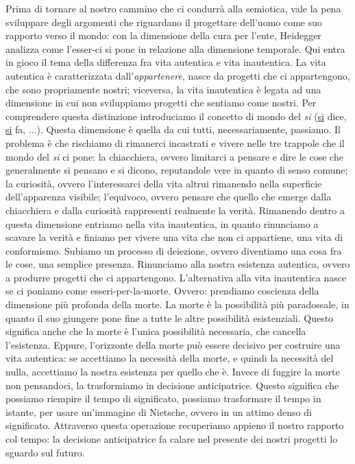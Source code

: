 \documentclass[a4paper,12pt,oneside]{article}%
\begin{document}
Prima di tornare al nostro cammino che ci condurrà alla semiotica, vale la pena sviluppare degli argomenti che riguardano il progettare dell'uomo come suo rapporto verso il mondo: con la dimensione della cura per l'ente, Heidegger analizza come l’esser-ci si pone in relazione alla dimensione temporale.
Qui entra in gioco il tema della differenza fra vita autentica e vita inautentica.
La vita autentica è caratterizzata dall'\textit{appartenere}, nasce da progetti che ci appartengono, che sono propriamente nostri; viceversa, la vita inautentica è legata ad una dimensione in cui non sviluppiamo progetti che sentiamo come nostri.
Per comprendere questa distinzione introduciamo il concetto di mondo del \textit{si} (\underline{si} dice, \underline{si} fa, ...). Questa dimensione è quella da cui tutti, necessariamente, passiamo. Il problema è che rischiamo di rimanerci incastrati e vivere nelle tre trappole che il mondo del \textit{si} ci pone: la chiacchiera, ovvero limitarci a pensare e dire le cose che generalmente si pensano e si dicono, reputandole vere in quanto di senso comune; la curiosità, ovvero l’interessarci della vita altrui rimanendo nella superficie dell’apparenza visibile; l’equivoco, ovvero pensare che quello che emerge dalla chiacchiera e dalla curiosità rappresenti realmente la verità.
Rimanendo dentro a questa dimensione entriamo nella vita inautentica, in quanto rinunciamo a scavare la verità e finiamo per vivere una vita che non ci appartiene, una vita di conformismo. Subiamo un processo di deiezione, ovvero diventiamo una cosa fra le cose, una semplice presenza. Rinunciamo alla nostra esistenza autentica, ovvero a produrre progetti che ci appartengono.
L’alternativa alla vita inautentica nasce se ci poniamo come esseri-per-la-morte. Ovvero: prendiamo coscienza della dimensione più profonda della morte. La morte è la possibilità più paradossale, in quanto il suo giungere pone fine a tutte le altre possibilità esistenziali. Questo significa anche che la morte è l’unica possibilità necessaria, che cancella l’esistenza. Eppure, l’orizzonte della morte può essere decisivo per costruire una vita autentica: se accettiamo la necessità della morte, e quindi la necessità del nulla, accettiamo la nostra esistenza per quello che è. Invece di fuggire la morte non pensandoci, la trasformiamo in decisione anticipatrice. Questo significa che possiamo riempire il tempo di significato, possiamo trasformare il tempo in istante, per usare un’immagine di Nietsche, ovvero in un attimo denso di significato. Attraverso questa operazione recuperiamo appieno il nostro rapporto col tempo: la decisione anticipatrice fa calare nel presente dei nostri progetti lo sguardo sul futuro.
\end{document}
